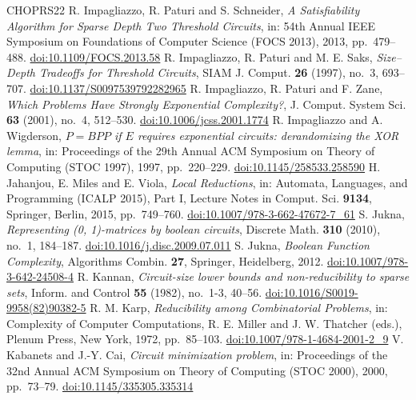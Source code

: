 \begin{thebibliography}{CHOPRS22}
 R. Impagliazzo, R. Paturi and S. Schneider, \emph{A Satisfiability Algorithm for Sparse Depth Two Threshold Circuits}, in: 54th Annual IEEE Symposium on Foundations of Computer Science (FOCS 2013), 2013, pp.~479--488. \href{https://doi.org/10.1109/FOCS.2013.58}{doi:10.1109/FOCS.2013.58}
 R. Impagliazzo, R. Paturi and M. E. Saks, \emph{Size--Depth Tradeoffs for Threshold Circuits}, SIAM J. Comput. \textbf{26} (1997), no.~3, 693--707. \href{https://doi.org/10.1137/S0097539792282965}{doi:10.1137/S0097539792282965}
 R. Impagliazzo, R. Paturi and F. Zane, \emph{Which Problems Have Strongly Exponential Complexity?}, J. Comput. System Sci. \textbf{63} (2001), no.~4, 512--530. \href{https://doi.org/10.1006/jcss.2001.1774}{doi:10.1006/jcss.2001.1774}
 R. Impagliazzo and A. Wigderson, \emph{$P=BPP$ if $E$ requires exponential circuits: derandomizing the XOR lemma}, in: Proceedings of the 29th Annual ACM Symposium on Theory of Computing (STOC 1997), 1997, pp.~220--229. \href{https://doi.org/10.1145/258533.258590}{doi:10.1145/258533.258590}
 H. Jahanjou, E. Miles and E. Viola, \emph{Local Reductions}, in: Automata, Languages, and Programming (ICALP 2015), Part I, Lecture Notes in Comput. Sci. \textbf{9134}, Springer, Berlin, 2015, pp.~749--760. \href{https://doi.org/10.1007/978-3-662-47672-7_61}{doi:10.1007/978-3-662-47672-7\_61}
 S. Jukna, \emph{Representing (0, 1)-matrices by boolean circuits}, Discrete Math. \textbf{310} (2010), no.~1, 184--187. \href{https://doi.org/10.1016/j.disc.2009.07.011}{doi:10.1016/j.disc.2009.07.011}
 S. Jukna, \emph{Boolean Function Complexity}, Algorithms Combin. \textbf{27}, Springer, Heidelberg, 2012. \href{https://doi.org/10.1007/978-3-642-24508-4}{doi:10.1007/978-3-642-24508-4}
 R. Kannan, \emph{Circuit-size lower bounds and non-reducibility to sparse sets}, Inform. and Control \textbf{55} (1982), no.~1-3, 40--56. \href{https://doi.org/10.1016/S0019-9958(82)90382-5}{doi:10.1016/S0019-9958(82)90382-5}
 R. M. Karp, \emph{Reducibility among Combinatorial Problems}, in: Complexity of Computer Computations, R. E. Miller and J. W. Thatcher (eds.), Plenum Press, New York, 1972, pp.~85--103. \href{https://doi.org/10.1007/978-1-4684-2001-2_9}{doi:10.1007/978-1-4684-2001-2\_9}
 V. Kabanets and J.-Y. Cai, \emph{Circuit minimization problem}, in: Proceedings of the 32nd Annual ACM Symposium on Theory of Computing (STOC 2000), 2000, pp.~73--79. \href{https://doi.org/10.1145/335305.335314}{doi:10.1145/335305.335314}

\end{thebibliography}
